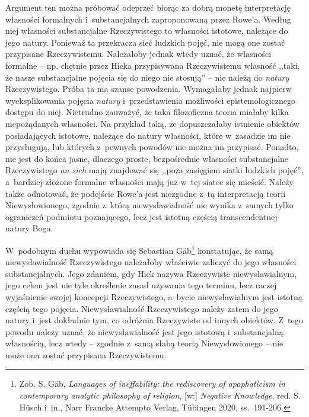 Argument ten można próbować odeprzeć biorąc za dobrą monetę interpretację własności formalnych i~substancjalnych zaproponowaną przez Rowe'a. Według niej własności substancjalne Rzeczywistego to własności istotowe, należące do jego natury. Ponieważ ta przekracza sieć ludzkich pojęć, nie mogą one zostać przypisane Rzeczywistemu. Należałoby jednak wtedy uznać, że własności formalne -- np. chętnie przez Hicka przypisywana Rzeczywistemu własność ,,taki, że nasze substancjalne pojęcia się do niego nie stosują'' -- nie należą do \textit{natury} Rzeczywistego. Próba ta ma szanse powodzenia. Wymagałaby jednak najpierw wyeksplikowania pojęcia \textit{natury} i~przedstawienia możliwości epistemologicznego dostępu do niej. Nietrudno zauważyć, że taka filozoficzna teoria miałaby kilka niepożądanych własności. Na przykład taką, że dopuszczałaby istnienie obiektów posiadających istotowe, należące do natury własności, które w~zasadzie im nie przysługują, lub których z~pewnych powodów nie można im przypisać. Ponadto, nie jest do końca jasne, dlaczego proste, bezpośrednie własności substancjalne Rzeczywistego \textit{an sich} mają znajdować się ,,poza zasięgiem siatki ludzkich pojęć'', a~bardziej złożone formalne własności mają już w~tej siatce się mieścić. Należy także odnotować, że podejście Rowe'a jest niezgodne z~tą interpretacją teorii Niewysłowionego, zgodnie z~którą niewysławialność nie wynika z~samych tylko ograniczeń podmiotu poznającego, lecz jest istotną częścią transcendentnej natury Boga.

W~podobnym duchu wypowiada się Sebastian Gäb\footnote{Zob. S. Gäb, \textit{Languages of ineffability: the rediscovery of apophaticism in contemporary} \textit{analytic philosophy of religion}, [w:] \textit{Negative Knowledge}, red. S. Hüsch i~in., Narr Francke Attempto Verlag, Tübingen 2020, ss.~191-206.} konstatując, że samą niewysławialność Rzeczywistego należałoby właściwie zaliczyć do jego własności substancjalnych. Jego zdaniem, gdy Hick nazywa Rzeczywiste niewysławialnym, jego celem jest nie tyle określenie zasad używania tego terminu, lecz raczej wyjaśnienie swojej koncepcji Rzeczywistego, a~bycie niewysławialnym jest istotną częścią tego pojęcia. Niewysławialność Rzeczywistego należy zatem do jego natury i~jest dokładnie tym, co odróżnia Rzeczywiste od innych obiektów. Z~tego powodu należy uznać, że niewysławialność jest jego istotową i~substancjalną własnością, lecz wtedy -- zgodnie z~samą słabą teorią Niewysłowionego -- nie może ona zostać przypisana Rzeczywistemu.

